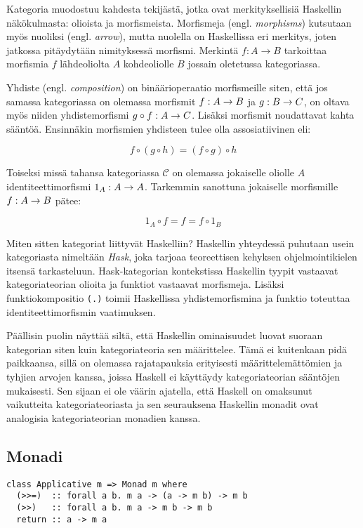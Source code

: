 \documentclass[finnish]{tktltiki2}
\begin{document}
Kategoria muodostuu kahdesta tekijästä, jotka ovat merkityksellisiä Haskellin näkökulmasta: olioista
ja morfismeista. Morfismeja (engl. \emph{morphisms}) kutsutaan myös nuoliksi (engl. \emph{arrow}),
mutta nuolella on Haskellissa eri merkitys, joten jatkossa pitäydytään nimityksessä morfismi.
Merkintä $f : A \rightarrow B$ tarkoittaa morfismia $f$ lähdeoliolta $A$ kohdeoliolle $B$ jossain
oletetussa kategoriassa.

Yhdiste (engl. \emph{composition}) on binäärioperaatio morfismeille siten, että jos samassa
kategoriassa on olemassa morfismit $f : A \rightarrow B$ ja $g : B \rightarrow C$, on oltava myös niiden
yhdistemorfismi $g \circ f : A \rightarrow C$. Lisäksi morfismit noudattavat kahta sääntöä. Ensinnäkin
morfismien yhdisteen tulee olla assosiatiivinen eli:

$$f \circ (g \circ h) = (f \circ g) \circ h$$

Toiseksi missä tahansa kategoriassa $\mathcal{C}$ on olemassa jokaiselle oliolle $A$
identiteettimorfismi $1_A : A \rightarrow A$. Tarkemmin sanottuna jokaiselle morfismille $f : A \rightarrow B$
pätee:

$$ 1_A \circ f = f = f \circ 1_B $$

Miten sitten kategoriat liittyvät Haskelliin? Haskellin yhteydessä puhutaan usein kategoriasta
nimeltään \emph{Hask}, joka tarjoaa teoreettisen kehyksen ohjelmointikielen itsensä tarkasteluun.
Hask-kategorian kontekstissa Haskellin tyypit vastaavat kategoriateorian olioita ja funktiot
vastaavat morfismeja. Lisäksi funktiokompositio \verb|(.)| toimii Haskellissa yhdistemorfismina ja
funktio  toteuttaa identiteettimorfismin vaatimuksen.

Päällisin puolin näyttää siltä, että Haskellin ominaisuudet luovat suoraan kategorian siten kuin
kategoriateoria sen määrittelee. Tämä ei kuitenkaan pidä paikkaansa, sillä on olemassa rajatapauksia
erityisesti määrittelemättömien ja tyhjien arvojen kanssa, joissa Haskell ei käyttäydy
kategoriateorian sääntöjen mukaisesti. Sen sijaan ei ole väärin ajatella, että Haskell on omaksunut
vaikutteita kategoriateoriasta ja sen seurauksena Haskellin monadit ovat analogisia kategoriateorian
monadien kanssa.

\subsection{Monadi}

\begin{lstlisting}[float,float,label={lst:monad},caption={Monad-tyyppiluokka}]
class Applicative m => Monad m where
  (>>=)  :: forall a b. m a -> (a -> m b) -> m b
  (>>)   :: forall a b. m a -> m b -> m b
  return :: a -> m a
\end{lstlisting}
\end{document}
